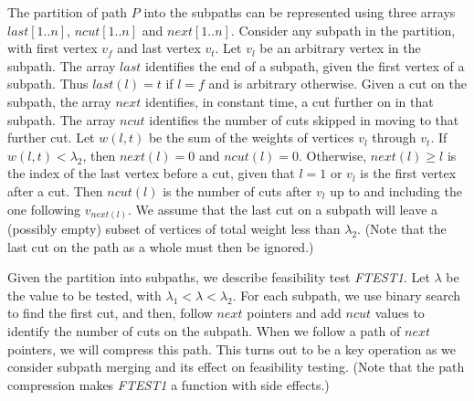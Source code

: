 The partition of path $P$ into the subpaths can be represented
using three arrays $last[1..n]$, $ncut[1..n]$ and $next[1..n]$.
Consider any subpath in the partition,
with first vertex $v_f$ and last vertex $v_t$.
Let $v_l$ be an arbitrary vertex in the subpath.
The array $last$ identifies the end of a subpath,
given the first vertex of a subpath.
Thus $last(l)=t$ if $l=f$ and is arbitrary otherwise.
Given a cut on the subpath,
the array $next$ identifies,
in constant time, a cut further on in that subpath.
The array $ncut$ identifies the number of cuts skipped
in moving to that further cut.
Let $w(l,t)$ be the sum of the weights of vertices $v_l$ through $v_t$.
If $w(l,t) < \lambda_2$,
then $next(l)=0$ and $ncut(l)=0$.
Otherwise, $next(l) \geq l$ is the index of the last vertex before a cut,
given that $l=1$ or $v_l$ is the first vertex after a cut.
Then $ncut(l)$ is the number of cuts after $v_l$ up to and including the one
following $v_{next(l)}$.
We assume that the last cut on a subpath will leave
a (possibly empty) subset of vertices of total weight less than $\lambda_2$.
(Note that the last cut on the path as a whole must then be ignored.)

Given the partition into subpaths, we describe feasibility test {\it FTEST1}.
Let $\lambda$ be the value to be tested,
with $\lambda_1 < \lambda < \lambda_2$.
For each subpath, we use binary search to find the first cut,
and then, follow $next$ pointers and add $ncut$ values to
identify the number of cuts on the subpath.
When we follow a path of $next$ pointers,
we will compress this path.
This turns out to be a key operation as we consider
subpath merging and its effect on feasibility testing.
(Note that the path compression makes
{\it FTEST1} a function with side effects.)\\


